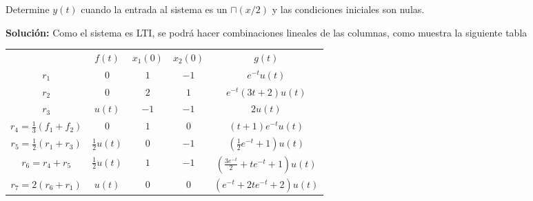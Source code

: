 \documentclass[letterpaper, 12pt]{article}
\newif\ifanswers
\begin{document}
\begin{enumerate}
    Determine $y(t)$ cuando la entrada al sistema es un $\sqcap(x/2)$ y las condiciones iniciales son nulas.
    \\

        \ifanswers
    {\color{red} \textbf{Solución:}
    Como el sistema es LTI, se podrá hacer combinaciones lineales de las columnas, como muestra la siguiente tabla

\begin{table}[H]
\centering
\begin{tabular}{ccccc}
{\color[HTML]{FE0000} }                             & {\color[HTML]{FE0000} $f(t)$}            & {\color[HTML]{FE0000} $x_1(0)$} & {\color[HTML]{FE0000} $x_2(0)$} & {\color[HTML]{FE0000} $g(t)$}                               \\
{\color[HTML]{FE0000} $r_1$}                        & {\color[HTML]{FE0000} $0$}               & {\color[HTML]{FE0000} $1$}      & {\color[HTML]{FE0000} $-1$}     & {\color[HTML]{FE0000} $e^{-t}u(t)$}                         \\
{\color[HTML]{FE0000} $r_2$}                        & {\color[HTML]{FE0000} $0$}               & {\color[HTML]{FE0000} $2$}      & {\color[HTML]{FE0000} $1$}      & {\color[HTML]{FE0000} $e^{-t}(3t+2)u(t)$}                   \\
{\color[HTML]{FE0000} $r_3$}                        & {\color[HTML]{FE0000} $u(t)$}            & {\color[HTML]{FE0000} $-1$}     & {\color[HTML]{FE0000} $-1$}     & {\color[HTML]{FE0000} $2u(t)$}                              \\
{\color[HTML]{FE0000} $r_4 = \frac{1}{3}(f_1+f_2)$} & {\color[HTML]{FE0000} $0$}               & {\color[HTML]{FE0000} $1$}      & {\color[HTML]{FE0000} $0$}      & {\color[HTML]{FE0000} $(t+1)e^{-t}u(t)$}                    \\
{\color[HTML]{FE0000} $r_5 = \frac{1}{2}(r_1+r_3)$} & {\color[HTML]{FE0000} $\frac{1}{2}u(t)$} & {\color[HTML]{FE0000} $0$}      & {\color[HTML]{FE0000} $-1$}     & {\color[HTML]{FE0000} $(\frac{1}{2}e^{-t}+1)u(t)$}          \\
{\color[HTML]{FE0000} $r_6 = r_4+r_5$}              & {\color[HTML]{FE0000} $\frac{1}{2}u(t)$} & {\color[HTML]{FE0000} $1$}      & {\color[HTML]{FE0000} $-1$}     & {\color[HTML]{FE0000} $(\frac{3e^{-t}}{2} +te^{-t}+1)u(t)$} \\
{\color[HTML]{FE0000} $r_7 = 2(r_6+r_1)$}           & {\color[HTML]{FE0000} $u(t)$}            & {\color[HTML]{FE0000} $0$}      & {\color[HTML]{FE0000} $0$}      & {\color[HTML]{FE0000} $(e^{-t} +2te^{-t}+2)u(t)$}          
\end{tabular}
\end{table}

}
\end{enumerate}
\end{document}
